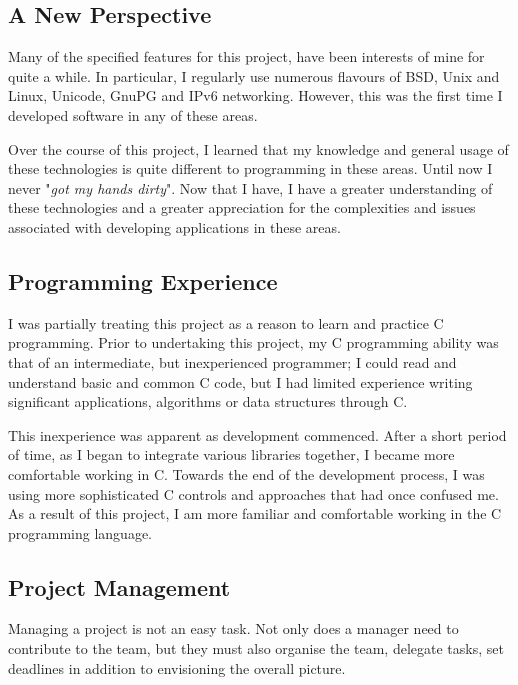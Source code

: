 
\subsection{A New Perspective}

Many of the specified features for this project, have been interests of
mine for quite a while. In particular, I regularly use numerous flavours
of BSD, Unix and Linux, Unicode, GnuPG and IPv6 networking. However, this 
was the first time I developed software in any of these areas.


Over the course of this project, I learned that my knowledge and general
usage of these technologies is quite different to programming in these
areas. Until now I never "\emph{got my hands dirty}". Now that I have, I
have a greater understanding of these technologies and a greater
appreciation for the complexities and issues associated with developing
applications in these areas.

\subsection{Programming Experience}

I was partially treating this project as a reason to learn and practice
C programming. Prior to undertaking this project, my C programming ability
was that of an intermediate, but inexperienced programmer; I could read 
and understand basic and common C code, but I had limited experience
writing significant applications, algorithms or data structures through
C.


This inexperience was apparent as development commenced. After a short
period of time, as I began to integrate various libraries together, I
became more comfortable working in C. Towards the end of the
development process, I was using more sophisticated C controls and
approaches that had once confused me. As a result of this project, I am
more familiar and comfortable working in the C programming language.


\subsection{Project Management}


Managing a project is not an easy task. Not only does a manager need to
contribute to the team, but they must also organise the team, delegate
tasks, set deadlines in addition to envisioning the overall picture.


